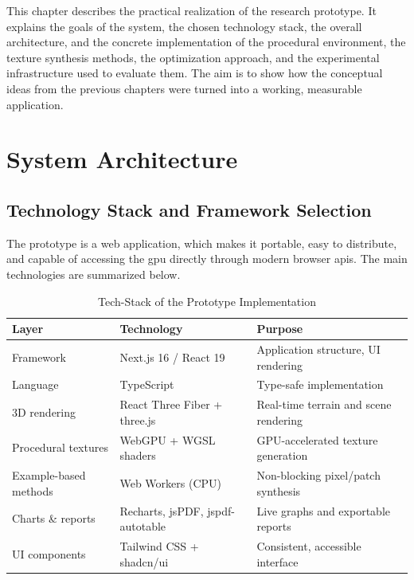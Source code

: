 This chapter describes the practical realization of the research prototype. It explains the goals of the system, the chosen technology stack, the overall architecture, and the concrete implementation of the procedural environment, the texture synthesis methods, the optimization approach, and the experimental infrastructure used to evaluate them. The aim is to show how the conceptual ideas from the previous chapters were turned into a working, measurable application.

\section{System Architecture}

\subsection{Technology Stack and Framework Selection}

The prototype is a web application, which makes it portable, easy to distribute, and capable of accessing the \gls{gpu} directly through modern browser \gls{api}s. The main technologies are summarized below.

\begin{table}[H]
    \centering
    \caption{Tech-Stack of the Prototype Implementation}
    \label{tab:prototype-techstack}
    \begin{tabularx}{\textwidth}{|l|l|X|}
    \hline
    \textbf{Layer} & \textbf{Technology} & \textbf{Purpose} \\
    \hline
    \hline
    
    Framework & Next.js 16 / React 19 & Application structure, UI rendering \\
    \hline

    Language & TypeScript & Type-safe implementation \\
    \hline

    3D rendering & React Three Fiber + three.js & Real-time terrain and scene rendering \\
    \hline

    Procedural textures & WebGPU + WGSL shaders & GPU-accelerated texture generation \\
    \hline

    Example-based methods & Web Workers (CPU) & Non-blocking pixel/patch synthesis \\
    \hline

    Charts \& reports & Recharts, jsPDF, jspdf-autotable & Live graphs and exportable reports \\
    \hline

    UI components & Tailwind CSS + shadcn/ui & Consistent, accessible interface \\
    \hline
    
    \end{tabularx}
\end{table}

